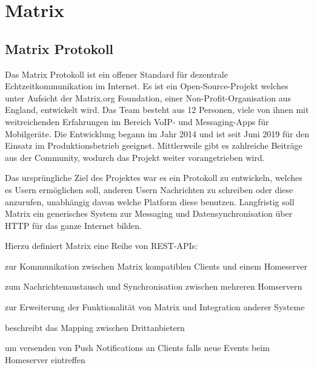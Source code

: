    \newpage
    \section{Matrix}\label{sec:matrix}

    \subsection{Matrix Protokoll}\label{subsec:matrix-protokoll}
    Das Matrix Protokoll ist ein offener Standard für dezentrale Echtzeitkommunikation im Internet.
    Es ist ein Open-Source-Projekt welches unter Aufsicht der Matrix.org Foundation, einer Non-Profit-Organisation aus England, entwickelt wird.
    Das Team besteht aus 12 Personen, viele von ihnen mit weitreichenden Erfahrungen im Bereich VoIP- und Messaging-Apps für Mobilgeräte.
    Die Entwicklung begann im Jahr 2014 und ist seit Juni 2019 für den Einsatz im Produktionsbetrieb geeignet.
    Mittlerweile gibt es zahlreiche Beiträge aus der Community, wodurch das Projekt weiter vorangetrieben wird.
    ~\cite{matrixfaq}

    Das ursprüngliche Ziel des Projektes war es ein Protokoll zu entwickeln, welches es Usern ermöglichen soll, anderen Usern Nachrichten zu schreiben oder diese anzurufen, unabhängig davon welche Platform diese benutzen.
    Langfristig soll Matrix ein generisches System zur Messaging und Datensynchronisation über HTTP für das ganze Internet bilden.
    ~\cite{matrixfaq}

    Hierzu definiert Matrix eine Reihe von REST-APIs:
    \begin{description}[leftmargin=!,labelwidth=5.5cm]
        \item [Client-Server-API\footnotemark]  zur Kommunikation zwischen Matrix kompatiblen Clients und einem Homeserver
        \item [Server-Server-API\footnotemark]  zum Nachrichtenaustausch und Synchronisation zwischen mehreren Homservern
        \item [Application-Service-API\footnotemark]  zur Erweiterung der Funktionalität von Matrix und Integration anderer Systeme
        \item [Identity-Service-API\footnotemark]  beschreibt das Mapping zwischen Drittanbietern
        \item [Push-Gateway-API\footnotemark]  um versenden von Push Notifications an Clients falls neue Events beim Homeserver eintreffen
    \end{description}



